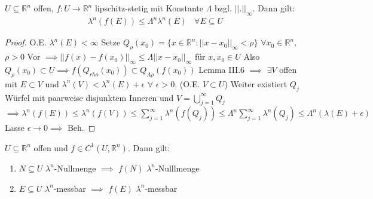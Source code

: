\documentclass[11pt,a4paper,fleqn,openany]{report}
\begin{document}
    \begin{lemma}
      $U \subseteq \mathbb{R}^n$ offen, $f: U \to \mathbb{R}^n$ lipschitz-stetig mit Konstante $\Lambda$ bzgl. $||.||_{\infty}$. Dann gilt:
      \begin{align*}
        \lambda^n(f(E)) \leq \Lambda^n \lambda^n(E) \ \ \ \ \forall E \subseteq U
      \end{align*}
    \end{lemma}

    \begin{proof}
      O.E. $\lambda^n(E) < \infty$ \newline
      Setze $Q_{\rho}(x_0) = \{x\in\mathbb{R}^n: ||x-x_0||_{\infty} < \rho\}$ $\forall x_0\in\mathbb{R}^n$, $\rho >0$ \newline
      Vor $\implies ||f(x)-f(x_0)||_{\infty} \leq \Lambda ||x-x_0||_{\infty}$ für $x,x_0\in U$ \newline
      Also $Q_{\rho}(x_0) \subset U \implies f(Q_{rho}(x_0)) \subset Q_{\Lambda \rho}(f(x_0))$ \newline
      Lemma III.6 $\implies$ $\exists V$ offen mit $E\subset V$ und $\lambda^n(V) < \lambda^n(E) + \epsilon$ $\forall$ $\epsilon >0$. \newline
      (O.E. $V\subset U$) \newline 
      Weiter existiert $Q_j$ Würfel mit paarweise disjunktem Inneren und $V = \bigcup\limits_{j=1}^{\infty}Q_j$ \newline
      $\implies \lambda^n(f(E)) \leq \lambda^n(f(V)) \leq \sum\limits_{j=1}^{\infty}\lambda^n(f(Q_j)) \leq \Lambda^n \sum\limits_{j=1}^{\infty}\lambda^n(Q_j) \leq \Lambda^n(\lambda(E)+\epsilon)$ \newline
      Lasse $\epsilon\to 0 \implies$ Beh. 
    \end{proof}

    \begin{theorem}
      $U \subseteq \mathbb{R}^n$ offen und $f \in C^1(U, \mathbb{R}^n)$. Dann gilt:
      \begin{enumerate}
        \item $N \subseteq U$ $\lambda^n$-Nullmenge $\implies$ $f(N)$ $\lambda^n$-Nulllmenge
        \item $E \subseteq U$ $\lambda^n$-messbar $\implies$ $f(E)$ $\lambda^n$-messbar
      \end{enumerate}
    \end{theorem}
\end{document}
